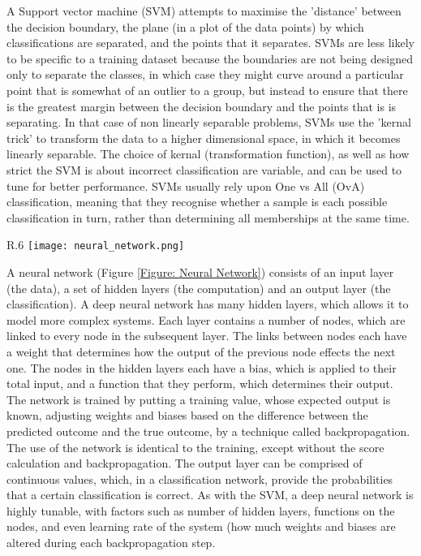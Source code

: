 \documentclass[12pt]{report}
\begin{document}
		A Support vector machine (SVM) attempts to maximise the 'distance' between the decision boundary, the plane (in a plot of the data points) by which classifications are separated, and the points that it separates.  SVMs are less likely to be specific to a training dataset because the boundaries are not being designed only to separate the classes, in which case they might curve around a particular point that is somewhat of an outlier to a group, but instead to ensure that there is the greatest margin between the decision boundary and the points that is is separating.  In that case of non linearly separable problems, SVMs use the 'kernal trick' to transform the data to a higher dimensional space, in which it becomes linearly separable.  The choice of kernal (transformation function), as well as how strict the SVM is about incorrect classification are variable, and can be used to tune for better performance.  SVMs usually rely upon One vs All (OvA) classification, meaning that they recognise whether a sample is each possible classification in turn, rather than determining all memberships at the same time.
		
		\begin{wrapfigure}{R}{.6\textwidth}
			\centering
			\texttt{[image: neural\_network.png]}
			\caption{A simple illustration of a neural network with 3 hidden layers.  Weights are applied on the connections between nodes, and biases are applied on the nodes themselves, before functions are applied}
			\label{Figure: Neural Network}
		\end{wrapfigure}
		
		A neural network (Figure \ref{Figure: Neural Network}) consists of an input layer (the data), a set of hidden layers (the computation) and an output layer (the classification).  A deep neural network has many hidden layers, which allows it to model more complex systems.  Each layer contains a number of nodes, which are linked to every node in the subsequent layer.  The links between nodes each have a weight that determines how the output of the previous node effects the next one.  The nodes in the hidden layers each have a bias, which is applied to their total input, and a function that they perform, which determines their output.  The network is trained by putting a training value, whose expected output is known,  adjusting weights and biases based on the difference between the predicted outcome and the true outcome, by a technique called backpropagation.  The use of the network is identical to the training, except without the score calculation and backpropagation.  The output layer can be comprised of continuous values, which, in a classification network, provide the probabilities that a certain classification is correct.  As with the SVM, a deep neural network is highly tunable, with factors such as number of hidden layers, functions on the nodes, and even learning rate of the system (how much weights and biases are altered during each backpropagation step.  %
		
\end{document}
